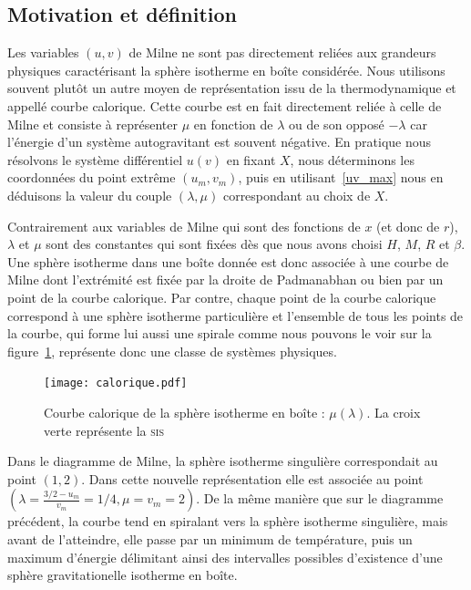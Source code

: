 \subsection{Motivation et définition}
	
	Les variables $(u,v)$ de Milne ne sont pas directement reliées aux grandeurs physiques caractérisant la sphère
	isotherme en boîte considérée. Nous utilisons souvent plutôt un autre moyen de représentation issu de la
	thermodynamique et appellé courbe calorique. Cette courbe est en fait directement reliée à celle de Milne et
	consiste à représenter $\mu$ en fonction de $\lambda$ ou de son opposé $-\lambda$ car l'énergie d'un système
	autogravitant est souvent négative. En pratique nous résolvons le système différentiel $u(v)$ en fixant $X$,
	nous déterminons les coordonnées du point extrême $(u_m,v_m)$, puis en utilisant~\ref{uv_max} nous en déduisons la valeur
	du couple $(\lambda,\mu)$ correspondant au choix de $X$.
	
	Contrairement aux variables de Milne qui sont des fonctions de $x$ (et donc de $r$), $\lambda$ et $\mu$ sont des
	constantes qui sont fixées dès que nous avons choisi $H$, $M$, $R$ et $\beta$. Une sphère isotherme dans une boîte
	donnée est donc associée à une courbe de Milne dont l'extrémité est fixée par la droite de Padmanabhan ou bien
	par un point de la courbe calorique. Par contre, chaque point de la courbe calorique correspond à une sphère isotherme
	particulière et l'ensemble de tous les points de la courbe, qui forme lui aussi une spirale comme nous pouvons le
	voir sur la figure~\ref{Ener}, représente donc une classe de systèmes physiques.
	
	\begin{figure}[h!]
		\centering \texttt{[image: calorique.pdf]}
		\caption{Courbe calorique de la sphère isotherme en boîte : $\mu(\lambda)$. La croix verte représente la \textsc{sis}}
		\label{Ener}
	\end{figure}

	Dans le diagramme de Milne, la sphère isotherme singulière correspondait au point $\left(1,2\right)$.
	Dans cette nouvelle représentation elle est associée au point $\left(\lambda = \frac{3/2 - u_m}{v_m} = 1/4, \mu = v_m = 2\right)$.
	De la même manière que sur le diagramme précédent, la courbe tend en spiralant vers la sphère isotherme singulière, mais avant de l'atteindre,
	elle passe par un minimum de température, puis un maximum d'énergie délimitant ainsi des intervalles possibles d'existence d'une sphère gravitationelle isotherme en boîte.

